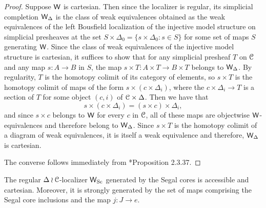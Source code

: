 \begin{proof} Suppose \(\mathsf{W}\) is cartesian.  Then since the localizer is regular, its simplicial completion \(\mathsf{W}_\Delta\) is the class of weak equivalences obtained as the weak equivalences of the left Bousfield localization of the injective model structure on simplicial presheaves at the set \(S\times \Delta_0= \{s\times \Delta_0: s\in S\}\) for some set of maps \(S\) generating \(\mathsf{W}\).  Since the class of weak equivalences of the injective model structure is cartesian, it suffices to show that for any simplicial presheaf \(T\) on \(\mathcal{C}\) and any map \(s:A\to B\) in \(S\), the map \(s\times T: A\times T \to B\times T\) belongs to \(\mathsf{W}_\Delta\).  By regularity, \(T\) is the homotopy colimit of its category of elements, so \(s\times T\) is the homotopy colimit of maps of the form \(s\times (c \times \Delta_i)\), where the \(c\times \Delta_i\to T\) is a section of \(T\) for some object \((c,i)\) of \(\mathcal{C}\times \Delta\).  Then we have that \[s\times (c \times \Delta_i)
= (s\times c)\times \Delta_i,\] and since \(s\times c\) belongs to \(\mathsf{W}\) for every \(c\) in \(\mathcal{C}\), all of these maps are objectwise \(\mathsf{W}\)-equivalences and therefore belong to \(\mathsf{W}_\Delta\).  Since \(s\times T\) is the homotopy colimit of a diagram of weak equivalences, it is itself a weak equivalence and therefore, \(\mathsf{W}_\Delta\) is cartesian.  

The converse follows immediately from \cite{cisinski-book}*{Proposition 2.3.37}.  \end{proof}
\begin{lemma}\label{weakcats} The regular \(\Delta\wr \mathcal{C}\)-localizer \(\mathsf{W}_{{\operatorname{Sc}}}\) generated by the Segal cores is accessible and cartesian.  Moreover, it is strongly generated by the set of maps comprising the Segal core inclusions and the map \(j:J\to e\).  
\end{lemma}
